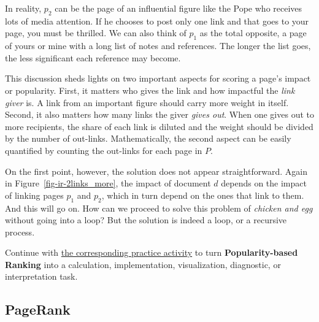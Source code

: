 \documentclass[
  letterpaper,
]{scrbook}
\begin{document}
In reality, \(p_2\) can be the page of an influential figure like the
Pope who receives lots of media attention. If he chooses to post only
one link and that goes to your page, you must be thrilled. We can also
think of \(p_1\) as the total opposite, a page of yours or mine with a
long list of notes and references. The longer the list goes, the less
significant each reference may become.

This discussion sheds lights on two important aspects for scoring a
page's impact or popularity. First, it matters who gives the link and
how impactful the \emph{link giver} is. A link from an important figure
should carry more weight in itself. Second, it also matters how many
links the giver \emph{gives out}. When one gives out to more recipients,
the share of each link is diluted and the weight should be divided by
the number of out-links. Mathematically, the second aspect can be easily
quantified by counting the out-links for each page in \(P\).

On the first point, however, the solution does not appear
straightforward. Again in Figure~\ref{fig-ir-2links_more}, the impact of
document \(d\) depends on the impact of linking pages \(p_1\) and
\(p_2\), which in turn depend on the ones that link to them. And this
will go on. How can we proceed to solve this problem of \emph{chicken
and egg} without going into a loop? But the solution is indeed a loop,
or a recursive process.

\begin{tcolorbox}[enhanced jigsaw, arc=.35mm, bottomrule=.15mm, bottomtitle=1mm, breakable, colback=white, colbacktitle=quarto-callout-tip-color!10!white, colframe=quarto-callout-tip-color-frame, coltitle=black, left=2mm, leftrule=.75mm, opacityback=0, opacitybacktitle=0.6, rightrule=.15mm, title=\textcolor{quarto-callout-tip-color}{\faLightbulb}\hspace{0.5em}{Put it into practice}, titlerule=0mm, toprule=.15mm, toptitle=1mm]

Continue with \hyperref[sec-pr-12-popularity-based-ranking]{the
corresponding practice activity} to turn \textbf{Popularity-based
Ranking} into a calculation, implementation, visualization, diagnostic,
or interpretation task.

\end{tcolorbox}

\subsection{PageRank}\label{pagerank}
\end{document}
